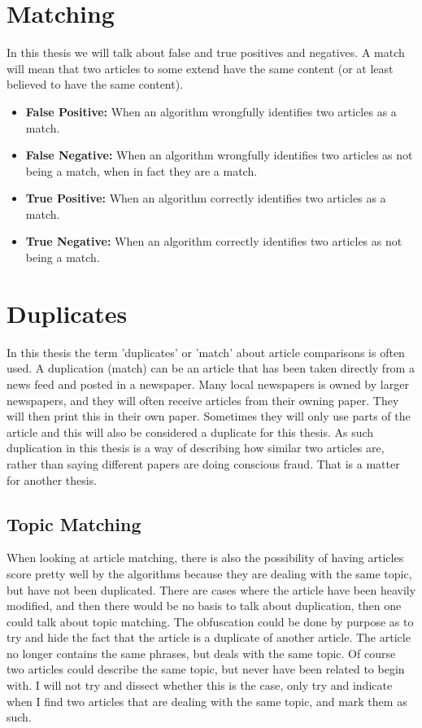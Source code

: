 \section{Matching}
In this thesis we will talk about false and true positives and negatives. A match will mean that two articles to some extend have the same content (or at least believed to have the same content).

\begin{itemize}
\item \textbf{False Positive:} When an algorithm wrongfully identifies two articles as a match.
\item \textbf{False Negative:} When an algorithm wrongfully identifies two articles as not being a match, when in fact they are a match.
\item \textbf{True Positive:} When an algorithm correctly identifies two articles as a match.
\item \textbf{True Negative:} When an algorithm correctly identifies two articles as not being a match.
\end{itemize}


\section{Duplicates}
In this thesis the term 'duplicates' or 'match' about article comparisons is often used. A duplication (match) can be an article that has been taken directly from a news feed and posted in a newspaper. Many local newspapers is owned by larger newspapers, and they will often receive articles from their owning paper. They will then print this in their own paper. Sometimes they will only use parts of the article and this will also be considered a duplicate for this thesis. As such duplication in this thesis is a way of describing how similar two articles are, rather than saying different papers are doing conscious fraud. That is a matter for another thesis. 

\subsection{Topic Matching}
When looking at article matching, there is also the possibility of having articles score pretty well by the algorithms because they are dealing with the same topic, but have not been duplicated. There are cases where the article have been heavily modified, and then there would be no basis to talk about duplication, then one could talk about topic matching. The obfuscation could be done by purpose as to try and hide the fact that the article is a duplicate of another article. The article no longer contains the same phrases, but deals with the same topic.
Of course two articles could describe the same topic, but never have been related to begin with. I will not try and dissect whether this is the case, only try and indicate when I find two articles that are dealing with the same topic, and mark them as such. 

